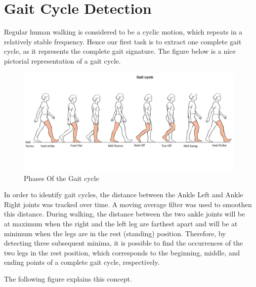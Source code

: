 \section{Gait Cycle Detection} \label{Gait Cycle Detection} 

\noindent Regular human walking is considered to be a cyclic motion, which repeats in a relatively stable frequency. Hence our first task is to extract one complete gait cycle, as it represents the complete gait signature. The figure below is a nice pictorial representation of a gait cycle.\\

\begin{figure}[h]
\centering
\includegraphics[scale=0.3]{gaitoriginal.jpg}
\caption{Phases Of the Gait cycle}
\end{figure}
 
\noindent In order to identify gait cycles, the distance between the Ankle Left and Ankle Right joints was tracked over time. A moving average filter was used to smoothen this distance. During walking, the distance between the two ankle joints will be at maximum when the right and the left leg are farthest apart and will be at minimum when the legs are in the rest (standing) position. Therefore, by detecting three subsequent minima, it is possible to find the occurrences of the two legs in the rest position, which corresponds to the beginning, middle, and ending points of a complete gait cycle, respectively.                                         

\noindent The following figure explains this concept.

